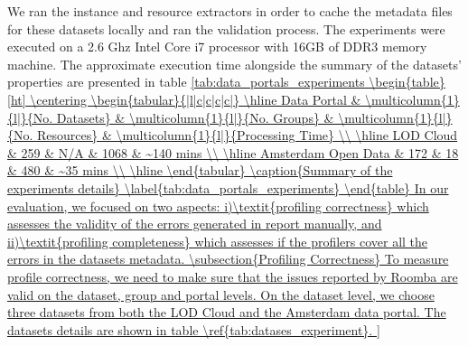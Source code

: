 \documentclass[runningheads,a4paper]{llncs}
\begin{document}
We ran the instance and resource extractors in order to cache the metadata files for these datasets locally and ran the validation process. The experiments were executed on a 2.6 Ghz Intel Core i7 processor with 16GB of DDR3 memory machine. The approximate execution time alongside  the summary of the datasets' properties are presented in table \ref{tab:data_portals_experiments

\begin{table}[ht]
\centering
\begin{tabular}{|l|c|c|c|c|}
\hline
Data Portal         & \multicolumn{1}{l|}{No. Datasets} & \multicolumn{1}{l|}{No. Groups} & \multicolumn{1}{l|}{No. Resources} & \multicolumn{1}{l|}{Processing Time} \\ \hline
LOD Cloud           & 259                               & N/A                            & 1068                               & ~140 mins                            \\ \hline
Amsterdam Open Data & 172                               & 18                             & 480                                & ~35 mins                             \\ \hline
\end{tabular}
\caption{Summary of the experiments details}
\label{tab:data_portals_experiments}
\end{table}

In our evaluation, we focused on two aspects: i)\textit{profiling correctness} which assesses the validity of the errors generated in report manually, and ii)\textit{profiling completeness} which assesses if the profilers cover all the errors in the datasets metadata.

\subsection{Profiling Correctness}

To measure profile correctness, we need to make sure that the issues reported by Roomba are valid on the dataset, group and portal levels.

On the dataset level, we choose three datasets from both the LOD Cloud and the Amsterdam data portal. The datasets details are shown in table \ref{tab:datases_experiment}.

}
\end{document}
